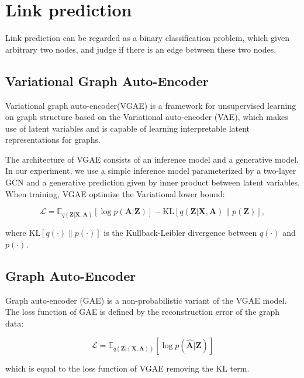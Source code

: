 \documentclass[fleqn,10pt]{SelfArx} %
\begin{document}
\section{Link prediction}
Link prediction can be regarded as a binary classification problem, which given arbitrary two nodes, and judge if there is an edge between these two nodes. 

\subsection{Variational Graph Auto-Encoder}
Variational graph auto-encoder(VGAE)\cite{kipf2016variational} is a framework for unsupervised learning on graph 
structure based on the Variational auto-encoder (VAE), which makes use of latent variables and is capable of learning interpretable latent representations for graphs.

The architecture of VGAE consists of an inference model and a generative model. In our experiment, we use a simple inference model parameterized by a two-layer GCN and a generative prediction given by inner product between latent variables. When training, VGAE optimize the Variational lower bound:
\begin{small}
\begin{equation}
	\mathcal{L} = \mathbb{E}_{q\left(\textbf{Z} | \textbf{X}, \textbf{A} \right)} [\log p\left(\textbf{A} | \textbf{Z} \right)] - \text{KL}[q\left(\textbf{Z} | \textbf{X}, \textbf{A} \right) \parallel  p\left(\textbf{Z} \right)],
\end{equation}
\end{small}
where $\text{KL}[q(\cdot) \parallel p(\cdot)]$ is the Kullback-Leibler divergence between 
$q(\cdot)$ and $p(\cdot)$.

\subsection{Graph Auto-Encoder}
Graph auto-encoder (GAE) is a non-probabilistic variant of the VGAE model. The loss function of GAE is defined by the
reconstruction error of the graph data:
\begin{small}
\begin{equation}
	\mathcal{L} = \mathbb{E}_{q\left(\textbf{Z} | \left(\textbf{X}, \textbf{A} \right) \right)} 
	[\log p (\hat{\textbf{A}} | \textbf{Z} )]
\end{equation}
\end{small}
which is equal to the loss function of VGAE removing the KL term.
\end{document}
